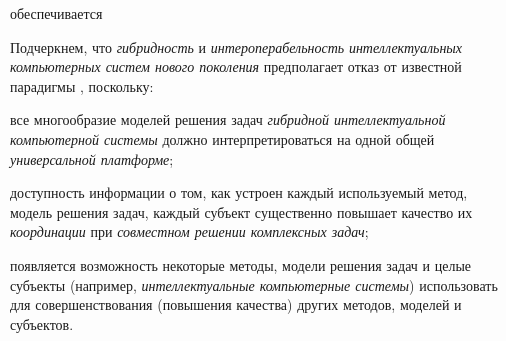 \begin{SCn}


\begin{scnrelfromlistcustom}{обеспечивается}
\end{scnrelfromlistcustom}
\end{SCn}

Подчеркнем, что \textit{гибридность} и \textit{интероперабельность} \textit{интеллектуальных компьютерных систем нового поколения} предполагает отказ от известной парадигмы , поскольку:

\begin{textitemize}
	\item
	все многообразие моделей решения задач \textit{гибридной интеллектуальной компьютерной системы} должно интерпретироваться на одной общей \textit{универсальной платформе};
	\item
	доступность информации о том, как устроен каждый используемый метод, модель решения задач, каждый субъект существенно повышает качество их \textit{координации} при \textit{совместном решении комплексных задач};
	\item
	появляется возможность некоторые методы, модели решения задач и целые субъекты (например, \textit{интеллектуальные компьютерные системы}) использовать для совершенствования (повышения качества) других методов, моделей и субъектов.
\end{textitemize}

